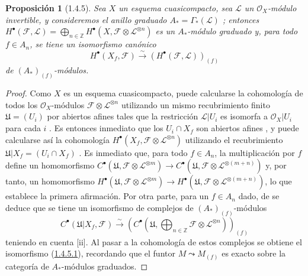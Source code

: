 \documentclass[10pt,oneside,openany]{book}
\theoremstyle{egaenv}\newtheorem*{env}{---}
\theoremstyle{egastatement}
\newtheorem*{proposition}{Proposición}
\theoremstyle{egadescription}
\newcommand{\oldpage}[2][]{\marginnote{\normalfont\scriptsize\textbf{#1}\,|\,#2}\ignorespaces}
\begin{document}
\begin{proposition}[1.4.5]
\label{III.1.4.5}
\label{III.1.4.5-fr}
\oldpage[III]{90}
Sea $X$ un esquema cuasicompacto, sea $\mathcal L$ un $\mathcal O_X$-módulo invertible, y consideremos el anillo graduado $A_*=\Gamma_*(\mathcal L)$ \textup{}; entonces $H^\bullet(\mathcal F,\mathcal L)
=\bigoplus_{n\in\mathbb Z}H^\bullet(X,\mathcal F\otimes\mathcal L^{\otimes n})$ es un $A_*$-módulo graduado y, para todo $f\in A_n$, se tiene un isomorfismo canónico
\begin{equation}
\label{III.1.4.5.1-fr}
\tag{1.4.5.1}
H^\bullet(X_f,\mathcal F)
\xrightarrow{\sim}(H^\bullet(\mathcal F,\mathcal L))_{(f)}
\end{equation}
de $(A_*)_{(f)}$-módulos.
\end{proposition}

\begin{proof}
Como $X$ es un esquema cuasicompacto, puede calcularse la cohomología de todos los $\mathcal O_X$-módulos $\mathcal F\otimes\mathcal L^{\otimes n}$ utilizando un mismo recubrimiento finito $\mathfrak U=(U_i)$ por abiertos afines tales que la restricción
$\mathcal L\vert U_i$ es isomorfa a $\mathcal O_X\vert U_i$ para cada
$i$ .
Es entonces inmediato que los $U_i\cap X_f$ son abiertos afines , y puede calcularse así la cohomología $H^\bullet(X_f,\mathcal F\otimes\mathcal L^{\otimes n})$ utilizando el recubrimiento $\mathfrak U\vert X_f=(U_i\cap X_f)$ .
Es inmediato que, para todo $f\in A_n$, la multiplicación por $f$ define un homomorfismo $C^\bullet(\mathfrak U,\mathcal F\otimes\mathcal L^{\otimes m})
\longrightarrow
C^\bullet(\mathfrak U,\mathcal F\otimes\mathcal L^{\otimes(m+n)})$ y, por tanto, un homomorfismo $H^\bullet(\mathfrak U,\mathcal F\otimes\mathcal L^{\otimes m})
\longrightarrow
H^\bullet(\mathfrak U,\mathcal F\otimes\mathcal L^{\otimes(m+n)})$, lo que establece la primera afirmación.
Por otra parte, para un $f\in A_n$ dado, de  se deduce que se tiene un isomorfismo de complejos de $(A_*)_{(f)}$-módulos
\[
C^\bullet(\mathfrak U\vert X_f,\mathcal F)
\xrightarrow{\sim}
\left(C^\bullet\left(\mathfrak U,
\bigoplus_{n\in\mathbb Z}\mathcal F\otimes\mathcal L^{\otimes n}
\right)\right)_{(f)}
\]
teniendo en cuenta [ii].
Al pasar a la cohomología de estos complejos se obtiene el isomorfismo (\hyperref[III.1.4.5.1]{1.4.5.1}), recordando que el funtor $M\leadsto M_{(f)}$ es exacto sobre la categoría de $A_*$-módulos graduados.
\end{proof}
\end{document}
